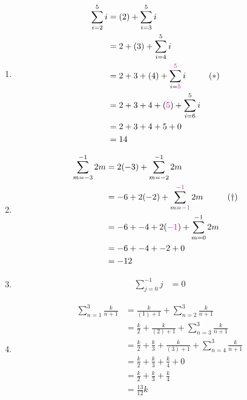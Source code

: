 \begin{enumerate}
  \item \begin{align*}
    \sum_{i=2}^{5} i &= (2) + \sum_{i=3}^{5} i\\
    &= 2 + (3) + \sum_{i=4}^{5} i\\
    &= 2 + 3 + (4) + \sum_{i={\color{magenta}5}}^{{\color{magenta}5}} i && (*)\\
    &= 2 + 3 + 4 + ({\color{magenta}5}) + \sum_{i=6}^{5} i\\
    &= 2 + 3 + 4 + 5 + 0\\
    &= 14
  \end{align*}

  \item \begin{align*}
    \sum_{m=-3}^{-1} 2m  &= 2(-3) + \sum_{m=-2}^{-1} 2m\\
    &= -6 + 2(-2) + \sum_{m={\color{magenta}-1}}^{{\color{magenta}-1}} 2m  && (\dag)\\
    &= -6 + -4 + 2({\color{magenta}-1}) + \sum_{m=0}^{-1} 2m\\
    &= -6 + -4 + -2 + 0\\
    &= -12
  \end{align*}


  \item \begin{align*}
    \sum_{j=0}^{-1} j &= 0
  \end{align*}

  \item \begin{align*}
    \sum_{n=1}^{3} \frac{k}{n+1} &= \frac{k}{(1)+1} + \sum_{n=2}^{3} \frac{k}{n+1}\\
    &= \frac{k}{2} + \frac{k}{(2)+1} + \sum_{n=3}^{3} \frac{k}{n+1}\\
    &= \frac{k}{2} + \frac{k}{3} + \frac{k}{(3)+1} + \sum_{n=4}^{3} \frac{k}{n+1}\\
    &= \frac{k}{2} + \frac{k}{3} + \frac{k}{4} + 0\\
    &= \frac{k}{2} + \frac{k}{3} + \frac{k}{4}\\
    &= \frac{13}{12}k
  \end{align*}
  

\end{enumerate}
